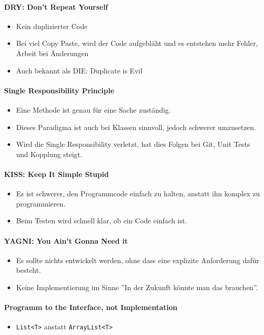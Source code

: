 \paragraph{DRY: Don't Repeat Yourself}
\begin{itemize}
	\item Kein duplizierter Code
	\item Bei viel Copy Paste, wird der Code aufgebläht und es entstehen mehr Fehler, Arbeit bei Änderungen
	\item Auch bekannt als DIE: Duplicate is Evil
\end{itemize}
\paragraph{Single Responsibility Principle}
\begin{itemize}
	\item Eine Methode ist genau für eine Sache zuständig.
	\item Dieses Paradigma ist auch bei Klassen sinnvoll, jedoch schwerer umzusetzen.
	\item Wird die Single Responsibility verletzt, hat dies Folgen bei Git, Unit Tests und Kopplung steigt.
\end{itemize}
\paragraph{KISS: Keep It Simple Stupid}
\begin{itemize}
	\item Es ist schwerer, den Programmcode einfach zu halten, anstatt ihn komplex zu programmieren.
	\item Beim Testen wird schnell klar, ob ein Code einfach ist.
\end{itemize}
\paragraph{YAGNI: You Ain't Gonna Need it}
\begin{itemize}
	\item Es sollte nichts entwickelt werden, ohne dass eine explizite Anforderung dafür besteht.
	\item Keine Implementierung im Sinne ''In der Zukunft könnte man das brauchen''.
\end{itemize}
\paragraph{Programm to the Interface, not Implementation}
\begin{itemize}
	\item \lstinline|List<T>| anstatt \lstinline|ArrayList<T>|
\end{itemize}
